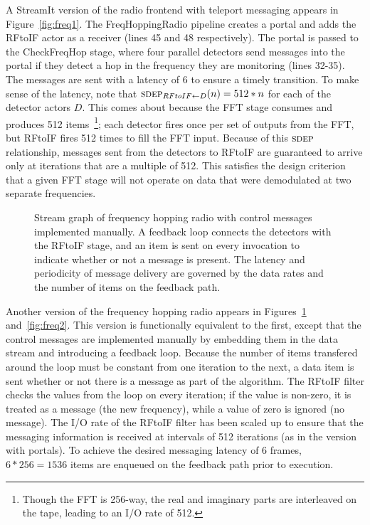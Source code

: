 A StreamIt version of the radio frontend with teleport messaging
appears in Figure~\ref{fig:freq1}.  The FreqHoppingRadio pipeline
creates a portal and adds the RFtoIF actor as a receiver (lines 45 and
48 respectively).  The portal is passed to the CheckFreqHop stage,
where four parallel detectors send messages into the portal if they
detect a hop in the frequency they are monitoring (lines 32-35).  The
messages are sent with a latency of 6 to ensure a timely transition.
To make sense of the latency, note that $\textsc{sdep}_{RFtoIF \small{\leftarrow} D}(n) = 512*n$
for each of the detector actors $D$.  This comes about because the FFT
stage consumes and produces 512 items~\footnote{Though the FFT is
  256-way, the real and imaginary parts are interleaved on the tape,
  leading to an I/O rate of 512.}; each detector fires once per set of
outputs from the FFT, but RFtoIF fires 512 times to fill the FFT
input.  Because of this $\textsc{sdep}$ relationship, messages sent from the
detectors to RFtoIF are guaranteed to arrive only at iterations that
are a multiple of 512.  This satisfies the design criterion that a
given FFT stage will not operate on data that were demodulated at two
separate frequencies.

\begin{figure}[t]
\centering
{}
\caption[Stream graph of frequency hopping radio with manual control
  messages.]{Stream graph of frequency hopping radio with control
  messages implemented manually.  A feedback loop connects the
  detectors with the RFtoIF stage, and an item is sent on every
  invocation to indicate whether or not a message is present.  The
  latency and periodicity of message delivery are governed by the data
  rates and the number of items on the feedback
  path. \protect\label{fig:fhr-manual}}
\end{figure}

Another version of the frequency hopping radio appears in
Figures~\ref{fig:fhr-manual} and~\ref{fig:freq2}.  This version is
functionally equivalent to the first, except that the control messages
are implemented manually by embedding them in the data stream and
introducing a feedback loop.  Because the number of items transfered
around the loop must be constant from one iteration to the next, a
data item is sent whether or not there is a message as part of the
algorithm.  The RFtoIF filter checks the values from the loop on every
iteration; if the value is non-zero, it is treated as a message (the
new frequency), while a value of zero is ignored (no message).  The
I/O rate of the RFtoIF filter has been scaled up to ensure that the
messaging information is received at intervals of 512 iterations (as
in the version with portals).  To achieve the desired messaging
latency of 6 frames, $6*256 = 1536$ items are enqueued on the feedback
path prior to execution.

